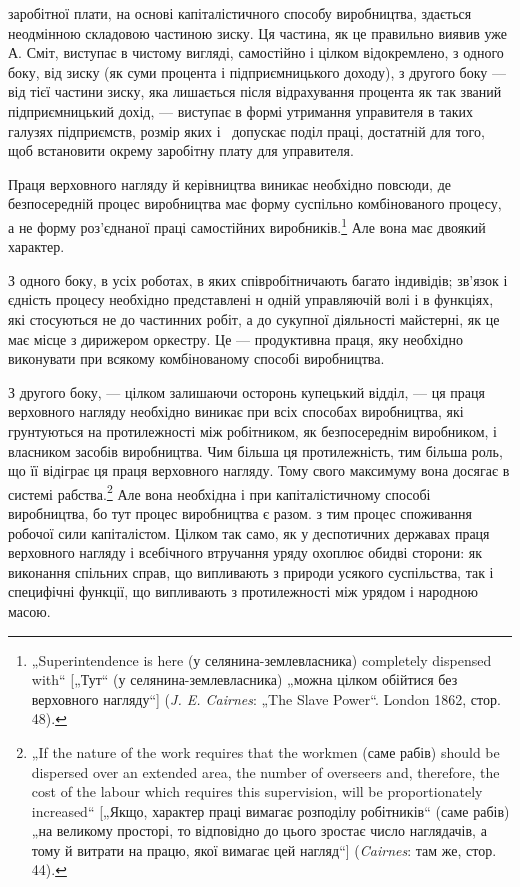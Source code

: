 \parcont{}  %
заробітної плати, на основі капіталістичного способу виробництва,
здається неодмінною складовою частиною зиску. Ця частина, як
це правильно виявив уже А. Сміт, виступає в чистому вигляді,
самостійно і цілком відокремлено, з одного боку, від зиску (як
суми процента і підприємницького доходу), з другого боку —
від тієї частини зиску, яка лишається після відрахування процента
як так званий підприємницький дохід, — виступає в формі утримання
управителя в таких галузях підприємств, розмір яких
і~ допускає поділ праці, достатній для того, щоб встановити
окрему заробітну плату для управителя.

Праця верховного нагляду й керівництва виникає необхідно
повсюди, де безпосередній процес виробництва має форму суспільно
комбінованого процесу, а не форму роз’єднаної праці
самостійних виробників.\footnote{
„Superintendence is here (у селянина-землевласника) completely dispensed
with“ [„Тут“ (у селянина-землевласника) „можна цілком обійтися без верховного
нагляду“] (\emph{J. E. Cairnes}: „The Slave Power“. London 1862, стор. 48).
} Але вона має двоякий характер.

З одного боку, в усіх роботах, в яких співробітничають багато
індивідів; зв’язок і єдність процесу необхідно представлені н
одній управляючій волі і в функціях, які стосуються не до частинних
робіт, а до сукупної діяльності майстерні, як це має місце
з дирижером оркестру. Це — продуктивна праця, яку необхідно
виконувати при всякому комбінованому способі виробництва.

З другого боку, — цілком залишаючи осторонь купецький
відділ, — ця праця верховного нагляду необхідно виникає при
всіх способах виробництва, які грунтуються на протилежності
між робітником, як безпосереднім виробником, і власником засобів
виробництва. Чим більша ця протилежність, тим більша
роль, що її відіграє ця праця верховного нагляду. Тому свого
максимуму вона досягає в системі рабства.\footnote{
„If the nature of the work requires that the workmen (саме рабів) should
be dispersed over an extended area, the number of overseers and, therefore, the
cost of the labour which requires this supervision, will be proportionately increased“
[„Якщо, характер праці вимагає розподілу робітників“ (саме рабів) „на
великому просторі, то відповідно до цього зростає число наглядачів, а тому й
витрати на працю, якої вимагає цей нагляд“] (\emph{Cairnes}: там же, стор. 44).
} Але вона необхідна
і при капіталістичному способі виробництва, бо тут процес
виробництва є разом. з тим процес споживання робочої
сили капіталістом. Цілком так само, як у деспотичних державах
праця верховного нагляду і всебічного втручання уряду
охоплює обидві сторони: як виконання спільних справ, що випливають
з природи усякого суспільства, так і специфічні функції,
що випливають з протилежності між урядом і народною
масою.

